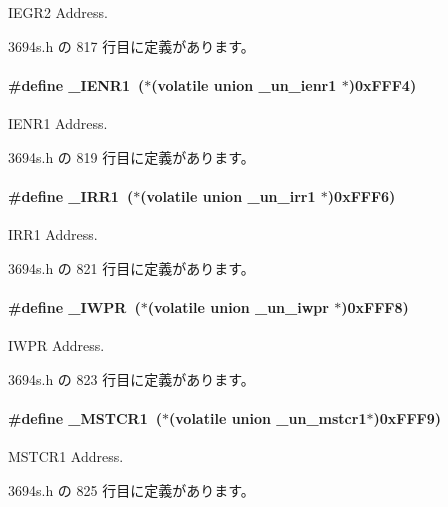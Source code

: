 I\+E\+G\+R2 Address. 



 3694s.\+h の 817 行目に定義があります。

\paragraph[{\+\_\+\+I\+E\+N\+R1}]{\setlength{\rightskip}{0pt plus 5cm}\#define \+\_\+\+I\+E\+N\+R1~($\ast$(volatile union  {\bf \+\_\+un\+\_\+ienr1} $\ast$)0x\+F\+F\+F4)}\label{3694s_8h_a529e5ffae60d60f98b2fe6a3eb4f68c3_a529e5ffae60d60f98b2fe6a3eb4f68c3}


I\+E\+N\+R1 Address. 



 3694s.\+h の 819 行目に定義があります。

\paragraph[{\+\_\+\+I\+R\+R1}]{\setlength{\rightskip}{0pt plus 5cm}\#define \+\_\+\+I\+R\+R1~($\ast$(volatile union  {\bf \+\_\+un\+\_\+irr1}  $\ast$)0x\+F\+F\+F6)}\label{3694s_8h_a61a1a835e032f341223be7f06b9a03d5_a61a1a835e032f341223be7f06b9a03d5}


I\+R\+R1 Address. 



 3694s.\+h の 821 行目に定義があります。

\paragraph[{\+\_\+\+I\+W\+P\+R}]{\setlength{\rightskip}{0pt plus 5cm}\#define \+\_\+\+I\+W\+P\+R~($\ast$(volatile union  {\bf \+\_\+un\+\_\+iwpr}  $\ast$)0x\+F\+F\+F8)}\label{3694s_8h_aaf4bef82ff6e916be9127c3efe5135b7_aaf4bef82ff6e916be9127c3efe5135b7}


I\+W\+P\+R Address. 



 3694s.\+h の 823 行目に定義があります。

\paragraph[{\+\_\+\+M\+S\+T\+C\+R1}]{\setlength{\rightskip}{0pt plus 5cm}\#define \+\_\+\+M\+S\+T\+C\+R1~($\ast$(volatile union  {\bf \+\_\+un\+\_\+mstcr1}$\ast$)0x\+F\+F\+F9)}\label{3694s_8h_ad74b69984a9ac2cb02233895e8ceecde_ad74b69984a9ac2cb02233895e8ceecde}


M\+S\+T\+C\+R1 Address. 



 3694s.\+h の 825 行目に定義があります。

